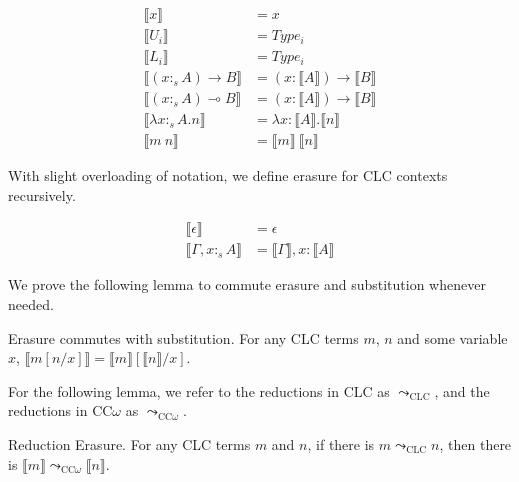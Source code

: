 \documentclass[sigplan,screen,review,authordraft]{acmart}
\newcommand{\stype}[1]{:_#1}
\newcommand{\step}{\leadsto}
\newcommand{\erase}[1]{\llbracket #1 \rrbracket}
\begin{document}
\begin{definition}
  \begin{align*}
    \erase{x}                             & = x                                     \\
    \erase{U_i}                           & = Type_i                                \\
    \erase{L_i}                           & = Type_i                                \\
    \erase{(x \stype{s} A) \rightarrow B} & = (x : \erase{A}) \rightarrow \erase{B} \\
    \erase{(x \stype{s} A) \multimap B}   & = (x : \erase{A}) \rightarrow \erase{B} \\
    \erase{\lambda x\stype{s}A.n}         & = \lambda x : \erase{A}.\erase{n}       \\
    \erase{m\ n}                          & = \erase{m}\ \erase{n}
  \end{align*}
\end{definition}

With slight overloading of notation, we define erasure for CLC contexts recursively.

\begin{definition}
  \begin{align*}
    \erase{\epsilon}              & = \epsilon                      \\
    \erase{\Gamma, x \stype{s} A} & = \erase{\Gamma}, x : \erase{A}
  \end{align*}
\end{definition}

We prove the following lemma to commute erasure and substitution whenever needed.

\begin{lemma}
  Erasure commutes with substitution. For any CLC terms $m$, $n$ and some variable $x$, $\erase{m[n/x]} = \erase{m}[\erase{n}/x]$.
\end{lemma}

For the following lemma, we refer to the reductions in CLC as $\step_{\scriptscriptstyle \text{CLC}}$, and the reductions in CC$\omega$ as $\step_{\scriptscriptstyle \text{CC$\omega$}}$.

\begin{theorem} \label{preserve}
  Reduction Erasure. For any CLC terms $m$ and $n$, if there is $m \step_{\scriptscriptstyle \text{CLC}} n$, then there is $\erase{m} \step_{\scriptscriptstyle \text{CC$\omega$}} \erase{n}$.
\end{theorem}
\end{document}

